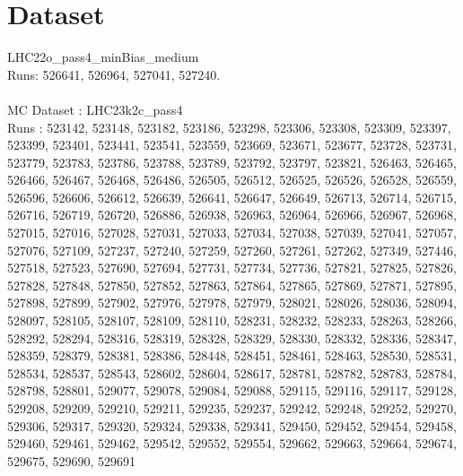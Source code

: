 \documentclass[ALICE,manyauthors]{ALICE_analysis_notes}
\begin{document}
\section{Dataset}
LHC22o\_pass4\_minBias\_medium\\
Runs: 526641, 526964, 527041, 527240.\\\\
MC Dataset : LHC23k2c\_pass4\\
Runs : 523142, 523148, 523182, 523186, 523298, 523306, 523308, 523309, 523397, 523399, 523401, 523441, 523541, 523559, 523669, 523671, 523677, 523728, 523731, 523779, 523783, 523786, 523788, 523789, 523792, 523797, 523821, 526463, 526465, 526466, 526467, 526468, 526486, 526505, 526512, 526525, 526526, 526528, 526559, 526596, 526606, 526612, 526639, 526641, 526647, 526649, 526713, 526714, 526715, 526716, 526719, 526720, 526886, 526938, 526963, 526964, 526966, 526967, 526968, 527015, 527016, 527028, 527031, 527033, 527034, 527038, 527039, 527041, 527057, 527076, 527109, 527237, 527240, 527259, 527260, 527261, 527262, 527349, 527446, 527518, 527523, 527690, 527694, 527731, 527734, 527736, 527821, 527825, 527826, 527828, 527848, 527850, 527852, 527863, 527864, 527865, 527869, 527871, 527895, 527898, 527899, 527902, 527976, 527978, 527979, 528021, 528026, 528036, 528094, 528097, 528105, 528107, 528109, 528110, 528231, 528232, 528233, 528263, 528266, 528292, 528294, 528316, 528319, 528328, 528329, 528330, 528332, 528336, 528347, 528359, 528379, 528381, 528386, 528448, 528451, 528461, 528463, 528530, 528531, 528534, 528537, 528543, 528602, 528604, 528617, 528781, 528782, 528783, 528784, 528798, 528801, 529077, 529078, 529084, 529088, 529115, 529116, 529117, 529128, 529208, 529209, 529210, 529211, 529235, 529237, 529242, 529248, 529252, 529270, 529306, 529317, 529320, 529324, 529338, 529341, 529450, 529452, 529454, 529458, 529460, 529461, 529462, 529542, 529552, 529554, 529662, 529663, 529664, 529674, 529675, 529690, 529691\\
\end{document}
